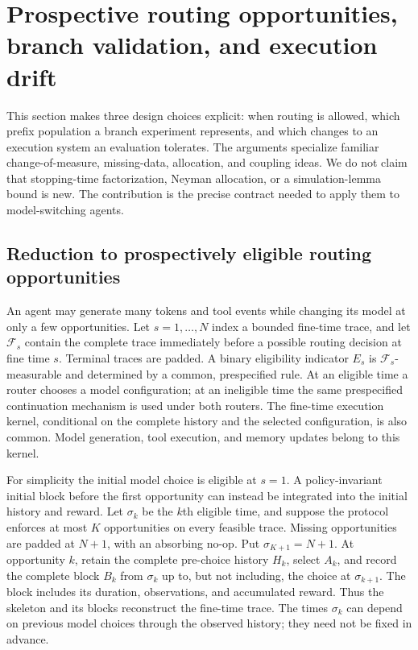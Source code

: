 \section{Prospective routing opportunities, branch validation, and execution drift}
\label{sec:extensions}

This section makes three design choices explicit: when routing is allowed, which prefix population a branch experiment represents, and which changes to an execution system an evaluation tolerates. The arguments specialize familiar change-of-measure, missing-data, allocation, and coupling ideas. We do not claim that stopping-time factorization, Neyman allocation, or a simulation-lemma bound is new. The contribution is the precise contract needed to apply them to model-switching agents.

\subsection{Reduction to prospectively eligible routing opportunities}
\label{sec:eligible}

An agent may generate many tokens and tool events while changing its model at only a few opportunities. Let $s=1,\ldots,N$ index a bounded fine-time trace, and let $\mathcal F_s$ contain the complete trace immediately before a possible routing decision at fine time $s$. Terminal traces are padded. A binary eligibility indicator $E_s$ is $\mathcal F_s$-measurable and determined by a common, prespecified rule. At an eligible time a router chooses a model configuration; at an ineligible time the same prespecified continuation mechanism is used under both routers. The fine-time execution kernel, conditional on the complete history and the selected configuration, is also common. Model generation, tool execution, and memory updates belong to this kernel.

For simplicity the initial model choice is eligible at $s=1$. A policy-invariant initial block before the first opportunity can instead be integrated into the initial history and reward. Let $\sigma_k$ be the $k$th eligible time, and suppose the protocol enforces at most $K$ opportunities on every feasible trace. Missing opportunities are padded at $N+1$, with an absorbing no-op. Put $\sigma_{K+1}=N+1$. At opportunity $k$, retain the complete pre-choice history $H_k$, select $A_k$, and record the complete block $B_k$ from $\sigma_k$ up to, but not including, the choice at $\sigma_{k+1}$. The block includes its duration, observations, and accumulated reward. Thus the skeleton and its blocks reconstruct the fine-time trace. The times $\sigma_k$ can depend on previous model choices through the observed history; they need not be fixed in advance.

